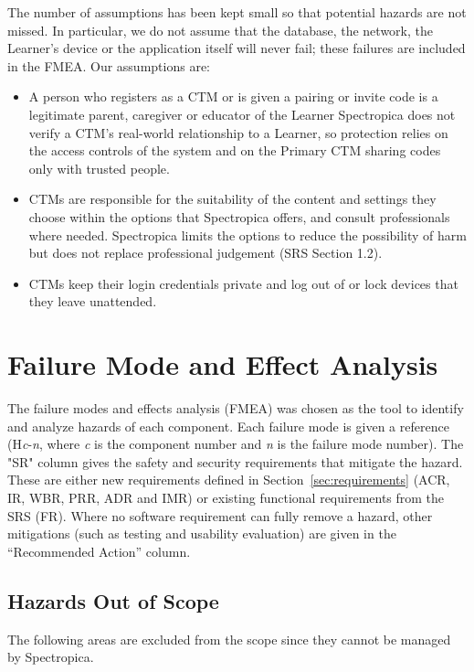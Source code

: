 \documentclass{article}
\begin{document}
The number of assumptions has been kept small so that potential hazards are not missed. In particular, we do not assume that the database, the network, the Learner's device or the application itself will never fail; these failures are included in the FMEA. Our assumptions are:

\begin{itemize}
    \item[\textbf{CA1.}] A person who registers as a CTM or is given a pairing or invite code is a legitimate parent, caregiver or educator of the Learner Spectropica does not verify a CTM's real-world relationship to a Learner, so protection relies on the access controls of the system and on the Primary CTM sharing codes only with trusted people.
    \item[\textbf{CA2.}] CTMs are responsible for the suitability of the content and settings they choose within the options that Spectropica offers, and consult professionals where needed. Spectropica limits the options to reduce the possibility of harm but does not replace professional
    judgement (SRS Section 1.2).
    \item[\textbf{CA3.}] CTMs keep their login credentials private and log out of or lock devices that they leave unattended.
\end{itemize}

\section{Failure Mode and Effect Analysis}

The failure modes and effects analysis (FMEA) was chosen as the tool to identify and analyze hazards of each component. Each failure mode is given a reference (H\emph{c}-\emph{n}, where \emph{c} is the component number and \emph{n} is the failure mode number). The "SR" column gives the safety and security requirements that mitigate the hazard. These are either new requirements defined in
Section~\ref{sec:requirements} (ACR, IR, WBR, PRR, ADR and IMR) or existing functional requirements from the SRS (FR). Where no software requirement can fully remove a hazard, other mitigations (such as testing and usability evaluation) are given in the ``Recommended Action'' column.

\subsection{Hazards Out of Scope}

The following areas are excluded from the scope since they cannot be managed by Spectropica.
\end{document}

